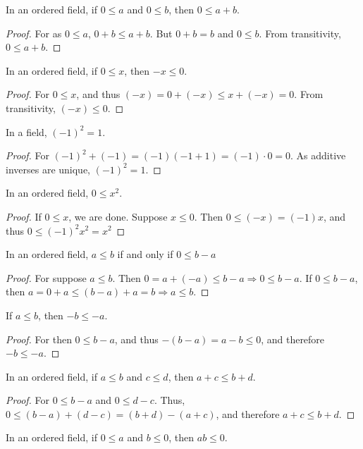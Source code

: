 \documentclass[crop=false,class=book]{standalone}
\begin{document}
\begin{theorem} In an ordered field, if $0\leq a$ and $0\leq b$, then $0\leq a+b$.
\end{theorem}
\begin{proof}
For as $0\leq a$, $0+b\leq a+b$. But $0+b = b$ and $0\leq b$. From transitivity, $0\leq a+b$.
\end{proof}
\begin{theorem}
In an ordered field, if $0\leq x$, then $-x\leq 0$.
\end{theorem}
\begin{proof}
For $0\leq x$, and thus $(-x)=0+(-x)\leq x+(-x) =0$. From transitivity, $(-x)\leq 0$.
\end{proof}
\begin{theorem}
In a field, $(-1)^2 = 1$.
\end{theorem}
\begin{proof}
For $(-1)^2 +(-1) = (-1)(-1+1) = (-1)\cdot 0 = 0$. As additive inverses are unique, $(-1)^2 = 1$.
\end{proof}
\begin{theorem}
In an ordered field, $0\leq x^2$.
\end{theorem}
\begin{proof}
If $0 \leq x$, we are done. Suppose $x\leq 0$. Then $0\leq (-x) = (-1)x$, and thus $0\leq (-1)^2 x^2=x^2$
\end{proof}
\begin{theorem}
In an ordered field, $a\leq b$ if and only if $0 \leq b-a$
\end{theorem}
\begin{proof}
For suppose $a\leq b$. Then $0=a+(-a)\leq b-a\Rightarrow 0 \leq b-a$. If $0\leq b-a$, then $a=0+a \leq (b-a)+a = b\Rightarrow a\leq b$.
\end{proof}
\begin{corollary}
If $a\leq b$, then $-b\leq -a$.
\end{corollary}
\begin{proof}
For then $0 \leq b-a$, and thus $-(b-a)=a-b\leq 0$, and therefore $-b \leq -a$.
\end{proof}
\begin{theorem}
In an ordered field, if $a\leq b$ and $c\leq d$, then $a+c \leq b+d$.
\end{theorem}
\begin{proof}
For $0\leq b-a$ and $0\leq d-c$. Thus, $0\leq (b-a)+(d-c)= (b+d)-(a+c)$, and therefore $a+c \leq b+d$.
\end{proof}
\begin{theorem}
In an ordered field, if $0\leq a$ and $b\leq 0$, then $ab\leq 0$.
\end{theorem}
\end{document}
